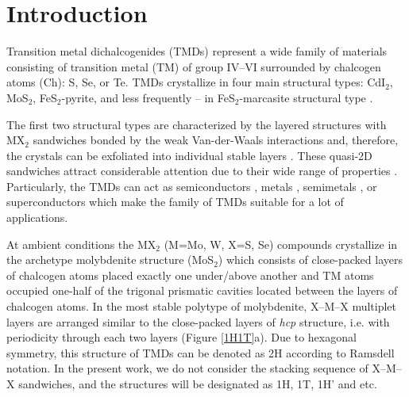 \documentclass[a4paperm]{article}
\begin{document}

\section*{Introduction}

Transition metal dichalcogenides (TMDs) represent a wide family of materials consisting of transition metal (TM) of group IV--VI surrounded by chalcogen atoms (Ch): S, Se, or Te. 
TMDs crystallize in four main structural types: CdI$_2$, MoS$_2$, FeS$_2$-pyrite, and less frequently -- in FeS$_2$-marcasite structural type \cite{wells}.

The first two structural types are characterized by the layered structures with MX$_2$ sandwiches bonded by the weak Van-der-Waals interactions and, therefore, the crystals can be exfoliated into individual stable layers \cite{zhang2020intercalation}. These quasi-2D sandwiches attract considerable attention due to their wide range of properties \cite{li2017graphene, SHI20181, xi2016ising, hu2019recent, pi2019recent}. 
Particularly, the TMDs can act as semiconductors \cite{nayeri2018transport}, metals \cite{zhao20212d}, semimetals \cite{xu2020high, zhao2020observation}, or superconductors \cite{wang2020nodeless,hsu2017topological} which make the family of TMDs suitable for a lot of applications. 


At ambient conditions the MX$_2$ (M=Mo, W, X=S, Se) compounds crystallize in the archetype molybdenite structure (MoS$_2$) which consists of close-packed layers of chalcogen atoms placed exactly one under/above another and TM atoms occupied one-half of the trigonal prismatic cavities located between the layers of chalcogen atoms. 
In the most stable polytype of molybdenite, X--M--X multiplet layers are arranged similar to the close-packed layers of {\it hcp} structure, i.e. with periodicity through each two layers (Figure \ref{1H1T}a).
Due to hexagonal symmetry, this structure of TMDs can be denoted as 2H according to Ramsdell notation.
In the present work, we do not consider the stacking sequence of X--M--X sandwiches, and the structures will be designated as 1H, 1T, 1H' and etc.
\end{document}
